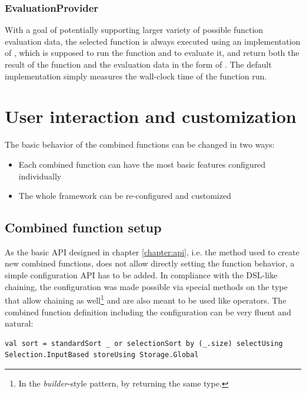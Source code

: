 \subsubsection{EvaluationProvider}

With a goal of potentially supporting larger variety of possible function evaluation data, the selected function is always executed using an implementation of , which is supposed to run the function and to evaluate it, and return both the result of the function and the evaluation data in the form of . The default implementation simply measures the wall-clock time of the function run.

\section{User interaction and customization}

The basic behavior of the combined functions can be changed in two ways:
\begin{itemize}
	\item Each combined function can have the most basic features configured individually
	\item The whole framework can be re-configured and customized
\end{itemize}

\subsection{Combined function setup}
\label{subsec:function_setup}

As the basic API designed in chapter \ref{chapter:api}, i.e. the  method used to create new combined functions, does not allow directly setting the function behavior, a simple configuration API has to be added. In compliance with the DSL-like  chaining, the configuration was made possible via special methods on the  type that allow chaining as well\footnote{In the \textit{builder}-style pattern, by returning the same type.} and are also meant to be used like operators. The combined function definition including the configuration can be very fluent and natural:

\lstset{style=Scala}
\begin{lstlisting}
val sort = standardSort _ or selectionSort by (_.size) selectUsing Selection.InputBased storeUsing Storage.Global
\end{lstlisting}

